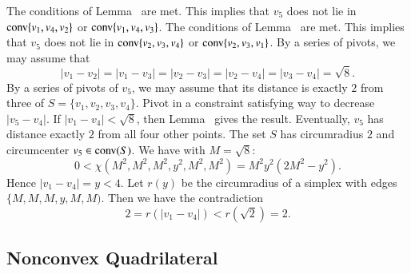 \begin{tarskidata}
\begin{tarski}

\begin{proved}
The conditions of Lemma~ are met. This implies
that $v_5$ does not lie in ${\operatorname{conv}}\{v_1,v_4,v_2\}$ or
	${\operatorname{conv}}\{v_1,v_4,v_3\}$.
The conditions of Lemma~ are met.  This implies that
$v_5$ does not lie in ${\operatorname{conv}}\{v_2,v_3,v_4\}$ or
	${\operatorname{conv}}\{v_2,v_3,v_1\}$.
By a series of pivots, we may assume that
	$$|v_1-v_2|=|v_1-v_3|=|v_2-v_3|=|v_2-v_4|=|v_3-v_4|=\sqrt8.$$
By a series of pivots of $v_5$, we may assume that its distance is exactly
$2$ from three of $S=\{v_1,v_2,v_3,v_4\}$.  
Pivot in a constraint satisfying way to decrease $|v_5-v_4|$.
If $|v_1-v_4|<\sqrt8$, then Lemma~ %
gives the
result.
Eventually, $v_5$ has distance exactly $2$ from all four other points.
The set $S$ has circumradius $2$ and circumcenter $v_5\in{\operatorname{conv}}(S)$.  
	We have with $M=\sqrt8$:
	$$0 < \chi(M^2,M^2,M^2,y^2,M^2,M^2)= M^2 y^2 (2M^2 - y^2).$$
Hence $|v_1-v_4|=y < 4$.
Let $r(y)$ be the circumradius of a simplex with edges $\{M,M,M,y,M,M)$.
Then we have the contradiction
	$$2 = r(|v_1-v_4|) < r(\sqrt2) = 2.$$
\swallowed\end{proved}
\end{tarski}












\begin{tarski}
\section{Nonconvex Quadrilateral}


\end{tarski}
\end{tarskidata}
